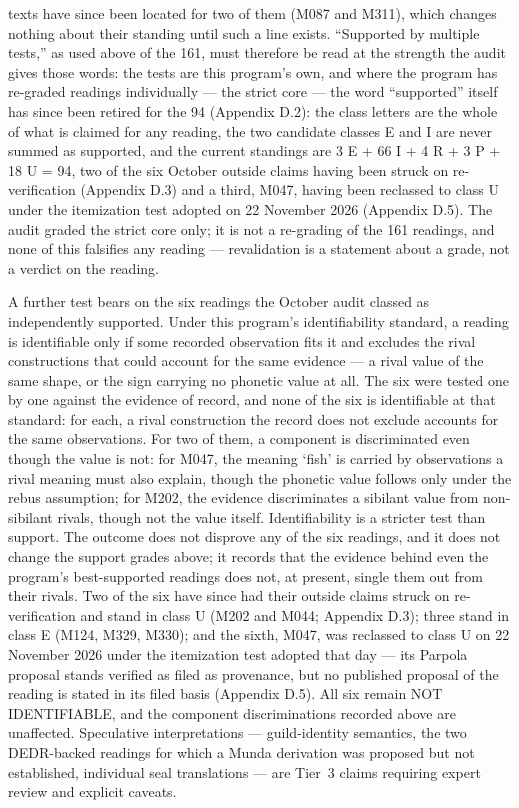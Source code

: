 \documentclass[11pt]{article}
\newcounter{none} %
\begin{document}
texts have since been located for two of them (M087 and M311), which changes nothing about their standing until such a line exists. ``Supported by multiple tests,'' as used above of the 161, must therefore be read at the strength the audit gives those words: the tests are this program's own, and where the program has re-graded readings individually --- the strict core --- the word ``supported'' itself has since been retired for the 94 (Appendix D.2): the class letters are the whole of what is claimed for any reading, the two candidate classes E and I are never summed as supported, and the current standings are 3 E + 66 I + 4 R + 3 P + 18 U = 94, two of the six October outside claims having been struck on re-verification (Appendix D.3) and a third, M047, having been reclassed to class U under the itemization test adopted on 22 November 2026 (Appendix D.5). The audit graded the strict core only; it is not a re-grading of the 161 readings, and none of this falsifies any reading --- revalidation is a statement about a grade, not a verdict on the reading.

A further test bears on the six readings the October audit classed as independently supported. Under this program's identifiability standard, a reading is identifiable only if some recorded observation fits it and excludes the rival constructions that could account for the same evidence --- a rival value of the same shape, or the sign carrying no phonetic value at all. The six were tested one by one against the evidence of record, and none of the six is identifiable at that standard: for each, a rival construction the record does not exclude accounts for the same observations. For two of them, a component is discriminated even though the value is not: for M047, the meaning `fish' is carried by observations a rival meaning must also explain, though the phonetic value follows only under the rebus assumption; for M202, the evidence discriminates a sibilant value from non-sibilant rivals, though not the value itself. Identifiability is a stricter test than support. The outcome does not disprove any of the six readings, and it does not change the support grades above; it records that the evidence behind even the program's best-supported readings does not, at present, single them out from their rivals. Two of the six have since had their outside claims struck on re-verification and stand in class U (M202 and M044; Appendix D.3); three stand in class E (M124, M329, M330); and the sixth, M047, was reclassed to class U on 22 November 2026 under the itemization test adopted that day --- its Parpola proposal stands verified as filed as provenance, but no published proposal of the reading is stated in its filed basis (Appendix D.5). All six remain NOT IDENTIFIABLE, and the component discriminations recorded above are unaffected.
 Speculative
interpretations --- guild-identity semantics, the two DEDR-backed readings for which a Munda derivation was proposed but not established,
individual seal translations --- are Tier~3 claims requiring expert
review and explicit caveats.
\end{document}
